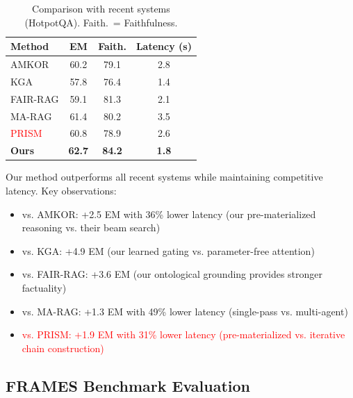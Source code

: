 \documentclass[10pt,twocolumn]{article}
\newcommand{\revisioncritical}[1]{\textcolor{red}{#1}}
\begin{document}
\begin{table}[t]
\centering
\caption{Comparison with recent systems (HotpotQA). Faith.~= Faithfulness.}
\label{tab:recent_results}
\small
\begin{tabular}{@{}lccc@{}}
\toprule
\textbf{Method} & \textbf{EM} & \textbf{Faith.} & \textbf{Latency (s)} \\
\midrule
AMKOR \cite{fang2024amkor} & 60.2 & 79.1 & 2.8 \\
KGA \cite{wang2024kga} & 57.8 & 76.4 & 1.4 \\
FAIR-RAG \cite{chen2024fairrag} & 59.1 & 81.3 & 2.1 \\
MA-RAG \cite{li2024marag} & 61.4 & 80.2 & 3.5 \\
\revisioncritical{PRISM \cite{chen2024prism}} & 60.8 & 78.9 & 2.6 \\
\midrule
\textbf{Ours} & \textbf{62.7} & \textbf{84.2} & \textbf{1.8} \\
\bottomrule
\end{tabular}
\end{table}

Our method outperforms all recent systems while maintaining competitive latency. Key observations:
\begin{itemize}
    \item vs. AMKOR: +2.5 EM with 36\% lower latency (our pre-materialized reasoning vs. their beam search)
    \item vs. KGA: +4.9 EM (our learned gating vs. parameter-free attention)
    \item vs. FAIR-RAG: +3.6 EM (our ontological grounding provides stronger factuality)
    \item vs. MA-RAG: +1.3 EM with 49\% lower latency (single-pass vs. multi-agent)
    \item \revisioncritical{vs. PRISM: +1.9 EM with 31\% lower latency (pre-materialized vs. iterative chain construction)}
\end{itemize}



\subsection{FRAMES Benchmark Evaluation}
\label{sec:frames}
\end{document}
